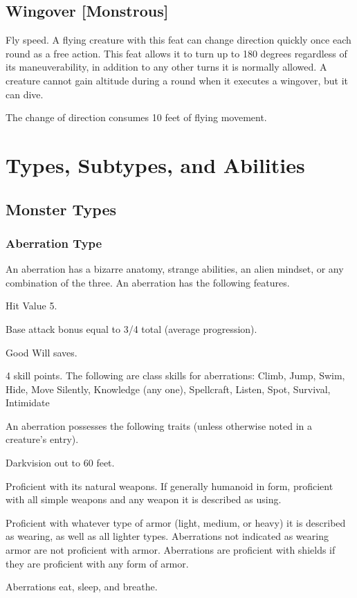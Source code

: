 \subsection{Wingover [Monstrous]}
 Fly speed.
 A flying creature with this feat can change direction quickly once each round as a free action. This feat allows it to turn up to 180 degrees regardless of its maneuverability, in addition to any other turns it is normally allowed. A creature cannot gain altitude during a round when it executes a wingover, but it can dive.

The change of direction consumes 10 feet of flying movement.

\section{Types, Subtypes, and Abilities}


\subsection{Monster Types}
\subsubsection{Aberration Type} An aberration has a bizarre anatomy, strange abilities, an alien mindset, or any combination of the three.
 An aberration has the following features.
\begin{itemize*}
\item Hit Value 5.
\item Base attack bonus equal to 3/4 total  (average progression).
\item Good Will saves.
\item 4 skill points. The following are class skills for aberrations: Climb, Jump, Swim, Hide, Move Silently, Knowledge (any one), Spellcraft, Listen, Spot, Survival, Intimidate 
\end{itemize*}
 An aberration possesses the following traits (unless otherwise noted in a creature's entry).
\begin{itemize*}
\item Darkvision out to 60 feet.
\item Proficient with its natural weapons. If generally humanoid in form, proficient with all simple weapons and any weapon  it is described as using.
\item Proficient with whatever type of armor (light, medium, or heavy) it is described as wearing, as well as all lighter types. Aberrations not indicated as wearing armor are not proficient with armor. Aberrations are proficient with shields if they are proficient with any form of armor.
\item Aberrations eat, sleep, and breathe.
\end{itemize*}


